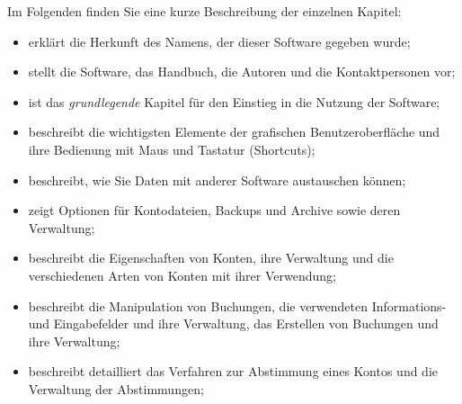 Im Folgenden finden Sie eine kurze Beschreibung der einzelnen Kapitel:%

\begin{itemize}
	\item {} erklärt die Herkunft des Namens, der dieser Software gegeben wurde;%
	\item {} stellt die Software, das Handbuch, die Autoren und die Kontaktpersonen vor;%
	\item {} ist das \emph{grundlegende} Kapitel für den Einstieg in die Nutzung der Software;%
	\item {} beschreibt die wichtigsten Elemente der grafischen Benutzeroberfläche und ihre Bedienung mit Maus und Tastatur (Shortcuts);%
	\item {} beschreibt, wie Sie Daten mit anderer Software austauschen können;%
	\item {} zeigt Optionen für Kontodateien, Backups und Archive sowie deren Verwaltung;%
	\item {} beschreibt die Eigenschaften von Konten, ihre Verwaltung und die verschiedenen Arten von Konten mit ihrer Verwendung;%
	\item {} beschreibt die Manipulation von Buchungen, die verwendeten Informations- und Eingabefelder und ihre Verwaltung, das Erstellen von Buchungen und ihre Verwaltung;%
	\item {} beschreibt detailliert das Verfahren zur Abstimmung eines Kontos und die Verwaltung der Abstimmungen;%

\end{itemize}
